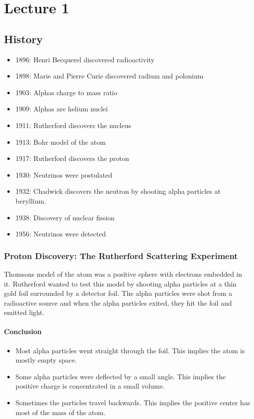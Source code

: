 \chapter{Lecture 1}
\section{History}
\begin{itemize}
    \item 1896: Henri Becquerel discovered radioactivity
    \item 1898: Marie and Pierre Curie discovered radium and polonium
    \item 1903: Alphas charge to mass ratio
    \item 1909: Alphas are helium nuclei
    \item 1911: Rutherford discovers the nucleus
    \item 1913: Bohr model of the atom
    \item 1917: Rutherford discovers the proton
    \item 1930: Neutrinos were postulated 
    \item 1932: Chadwick discovers the neutron by shooting alpha particles at beryllium. 
    \item 1938: Discovery of nuclear fission
    \item 1956: Neutrinos were detected 
\end{itemize}

\subsection{Proton Discovery: The Rutherford Scattering Experiment}

Thomsons model of the atom was a positive sphere with electrons embedded in it. Rutherford wanted to test this model by shooting alpha particles at a thin gold foil surrounded by a detector foil. The alpha particles were shot from a radioactive source and when the alpha particles exited, they hit the foil and emitted light. 
\subsubsection{Conclusion}
\begin{itemize}
    \item Most alpha particles went straight through the foil. This implies the atom is mostly empty space.
    \item Some alpha particles were deflected by a small angle. This implies the positive charge is concentrated in a small volume.
    \item Sometimes the particles travel backwards. This implies the positive center has most of the mass of the atom.
\end{itemize}

